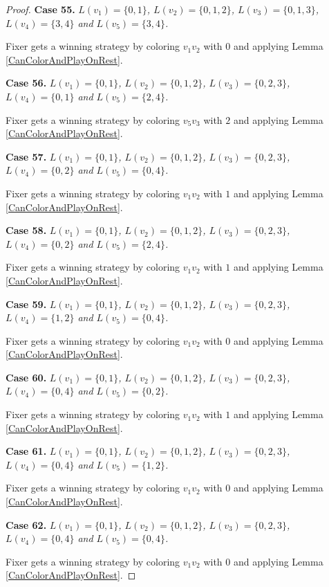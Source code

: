 \documentclass[12pt]{amsart}
\theoremstyle{plain}
\theoremstyle{definition}
\theoremstyle{remark}
\begin{document}
\begin{proof}
\noindent\textbf{Case 55.  }\textit{$L(v_1) = \{0, 1\}$, $L(v_2) = \{0, 1, 2\}$, $L(v_3) = \{0, 1, 3\}$, $L(v_4) = \{3, 4\}$ and $L(v_5) = \{3, 4\}$.}

Fixer gets a winning strategy by coloring $v_1v_2$ with $0$ and applying Lemma \ref{CanColorAndPlayOnRest}.

\noindent\textbf{Case 56.  }\textit{$L(v_1) = \{0, 1\}$, $L(v_2) = \{0, 1, 2\}$, $L(v_3) = \{0, 2, 3\}$, $L(v_4) = \{0, 1\}$ and $L(v_5) = \{2, 4\}$.}

Fixer gets a winning strategy by coloring $v_5v_3$ with $2$ and applying Lemma \ref{CanColorAndPlayOnRest}.

\noindent\textbf{Case 57.  }\textit{$L(v_1) = \{0, 1\}$, $L(v_2) = \{0, 1, 2\}$, $L(v_3) = \{0, 2, 3\}$, $L(v_4) = \{0, 2\}$ and $L(v_5) = \{0, 4\}$.}

Fixer gets a winning strategy by coloring $v_1v_2$ with $1$ and applying Lemma \ref{CanColorAndPlayOnRest}.

\noindent\textbf{Case 58.  }\textit{$L(v_1) = \{0, 1\}$, $L(v_2) = \{0, 1, 2\}$, $L(v_3) = \{0, 2, 3\}$, $L(v_4) = \{0, 2\}$ and $L(v_5) = \{2, 4\}$.}

Fixer gets a winning strategy by coloring $v_1v_2$ with $1$ and applying Lemma \ref{CanColorAndPlayOnRest}.

\noindent\textbf{Case 59.  }\textit{$L(v_1) = \{0, 1\}$, $L(v_2) = \{0, 1, 2\}$, $L(v_3) = \{0, 2, 3\}$, $L(v_4) = \{1, 2\}$ and $L(v_5) = \{0, 4\}$.}

Fixer gets a winning strategy by coloring $v_1v_2$ with $0$ and applying Lemma \ref{CanColorAndPlayOnRest}.

\noindent\textbf{Case 60.  }\textit{$L(v_1) = \{0, 1\}$, $L(v_2) = \{0, 1, 2\}$, $L(v_3) = \{0, 2, 3\}$, $L(v_4) = \{0, 4\}$ and $L(v_5) = \{0, 2\}$.}

Fixer gets a winning strategy by coloring $v_1v_2$ with $1$ and applying Lemma \ref{CanColorAndPlayOnRest}.

\noindent\textbf{Case 61.  }\textit{$L(v_1) = \{0, 1\}$, $L(v_2) = \{0, 1, 2\}$, $L(v_3) = \{0, 2, 3\}$, $L(v_4) = \{0, 4\}$ and $L(v_5) = \{1, 2\}$.}

Fixer gets a winning strategy by coloring $v_1v_2$ with $0$ and applying Lemma \ref{CanColorAndPlayOnRest}.

\noindent\textbf{Case 62.  }\textit{$L(v_1) = \{0, 1\}$, $L(v_2) = \{0, 1, 2\}$, $L(v_3) = \{0, 2, 3\}$, $L(v_4) = \{0, 4\}$ and $L(v_5) = \{0, 4\}$.}

Fixer gets a winning strategy by coloring $v_1v_2$ with $0$ and applying Lemma \ref{CanColorAndPlayOnRest}.


\end{proof}
\end{document}
